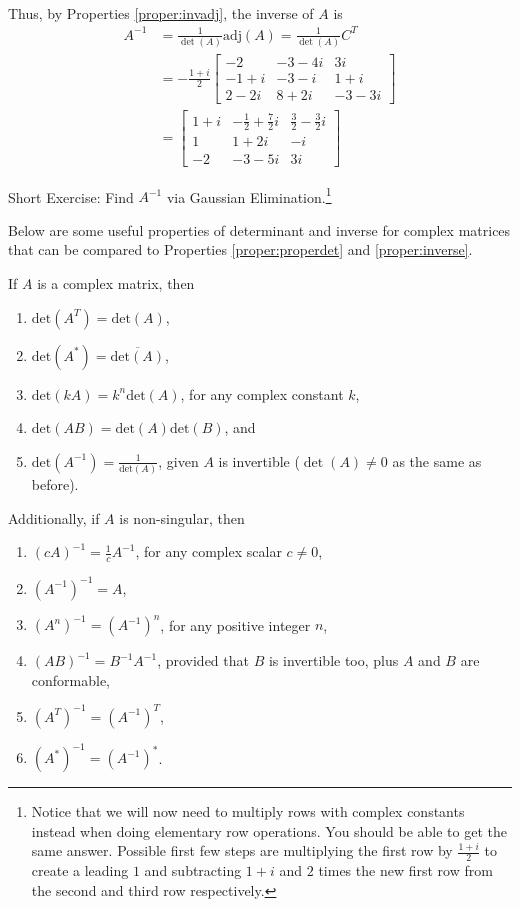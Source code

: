 \begin{solution}
\begin{align*}
\end{align*}
Thus, by Properties \ref{proper:invadj}, the inverse of $A$ is
\begin{align*}
A^{-1} &= \frac{1}{\det(A)} \text{adj}(A) = \frac{1}{\det(A)} C^T \\
&= -\frac{1+i}{2} 
\begin{bmatrix}
-2 & -3-4i & 3i \\
-1+i & -3-i & 1+i \\
2-2i & 8+2i & -3-3i
\end{bmatrix} \\
&= 
\begin{bmatrix}
1+i & -\frac{1}{2}+\frac{7}{2}i & \frac{3}{2}-\frac{3}{2}i \\
1 & 1+2i & -i \\
-2 & -3-5i & 3i
\end{bmatrix} 
\end{align*}
\end{solution}

Short Exercise: Find $A^{-1}$ via Gaussian Elimination.\footnote{Notice that we will now need to multiply rows with complex constants instead when doing elementary row operations. You should be able to get the same answer. Possible first few steps are multiplying the first row by $\frac{1+i}{2}$ to create a leading $1$ and subtracting $1+i$ and $2$ times the new first row from the second and third row respectively.}

Below are some useful properties of determinant and inverse for complex matrices that can be compared to Properties \ref{proper:properdet} and \ref{proper:inverse}.
\begin{proper}
If $A$ is a complex matrix, then
\begin{enumerate}
\item $\text{det}(A^T) = \text{det}(A)$,
\item $\text{det}(A^*) = \overline{\text{det}(A)}$,
\item $\text{det}(kA) = k^n \text{det}(A)$, for any complex constant $k$,
\item $\text{det}(AB) = \text{det}(A)\text{det}(B)$, and
\item $\text{det}(A^{-1}) = \frac{1}{\text{det}(A)}$, given $A$ is invertible ($\det(A) \neq 0$ as the same as before).
\end{enumerate}
Additionally, if $A$ is non-singular, then
\begin{enumerate}
\item $(cA)^{-1} = \frac{1}{c}A^{-1}$, for any complex scalar $c \neq 0$,
\item $(A^{-1})^{-1} = A$,
\item $(A^n)^{-1} = (A^{-1})^n$, for any positive integer $n$,
\item $(AB)^{-1} = B^{-1}A^{-1}$, provided that $B$ is invertible too, plus $A$ and $B$ are conformable,
\item $(A^T)^{-1} = (A^{-1})^T$,
\item $(A^*)^{-1} = (A^{-1})^*$.
\end{enumerate}
\end{proper}

